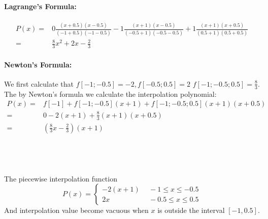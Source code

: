 \documentclass{article}
\begin{document}
	\maketitle
	\thispagestyle{fancy}
	\tableofcontents
	
	\section*{}

\section{~}
\subsection{~}
\paragraph{Lagrange's Formula:}
\begin{equation}
\begin{split}
P(x) = & 0\frac{(x+0.5)(x-0.5)}{(-1+0.5)(-1-0.5)}  -
1\frac{(x+1)(x-0.5)}{(-0.5+1)(-0.5-0.5)} + 
1\frac{(x+1)(x+0.5)}{(0.5+1)(0.5+0.5)}\\
= & \frac{8}{3} x^2 + 2x - \frac{2}{3}
\end{split}
\end{equation}
\paragraph{Newton's Formula:}
We first calculate that 
$f[-1;-0.5] = -2, f[-0.5;0.5] = 2$
$f[-1;-0.5;0.5] = \frac{8}{3}.$
The by Newton's formula we calculate the interpolation polynomial:
\begin{equation}
\begin{split}
P(x) = & f[-1] + f[-1;-0.5](x+1) + f[-1;-0.5;0.5](x+1)(x+0.5) \\ 
= & 0 - 2(x+1)  + \frac{8}{3}(x+1)(x+0.5) \\
= & (\frac{8}{3}x - \frac{2}{3})(x+1)
\end{split}
\end{equation}

\subsection{~}
The piecewise interpolation function 
\begin{equation}
P(x) = \left\{ 
\begin{aligned}
-2(x+1) & ~~-1\le x \le -0.5 \\
2x &~~ -0.5 \le x \le 0.5
\end{aligned}
 \right.
\end{equation}
And interpolation value become vacuous when $x$ is outside the interval $[-1,0.5]$.
\end{document}
